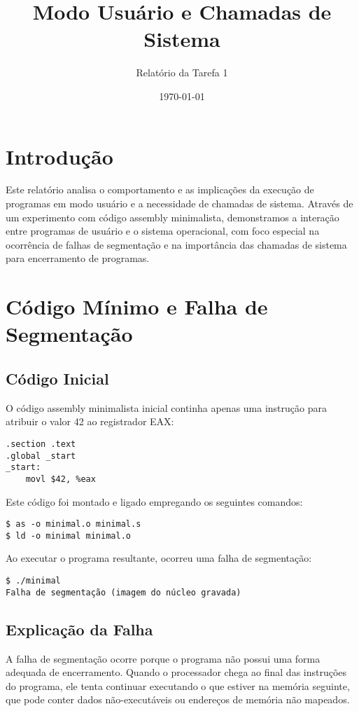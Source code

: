 \documentclass[12pt,a4paper]{article}
\title{Modo Usuário e Chamadas de Sistema}
\author{Relatório da Tarefa 1}
\date{\today}
\begin{document}
\maketitle

\section{Introdução}

Este relatório analisa o comportamento e as implicações da execução de programas em modo usuário e a necessidade de chamadas de sistema. Através de um experimento com código assembly minimalista, demonstramos a interação entre programas de usuário e o sistema operacional, com foco especial na ocorrência de falhas de segmentação e na importância das chamadas de sistema para encerramento de programas.

\section{Código Mínimo e Falha de Segmentação}

\subsection{Código Inicial}

O código assembly minimalista inicial continha apenas uma instrução para atribuir o valor 42 ao registrador EAX:

\begin{verbatim}
.section .text
.global _start
_start:
    movl $42, %eax
\end{verbatim}

Este código foi montado e ligado empregando os seguintes comandos:

\begin{verbatim}
$ as -o minimal.o minimal.s
$ ld -o minimal minimal.o
\end{verbatim}

Ao executar o programa resultante, ocorreu uma falha de segmentação:

\begin{verbatim}
$ ./minimal
Falha de segmentação (imagem do núcleo gravada)
\end{verbatim}

\subsection{Explicação da Falha}

A falha de segmentação ocorre porque o programa não possui uma forma adequada de encerramento. Quando o processador chega ao final das instruções do programa, ele tenta continuar executando o que estiver na memória seguinte, que pode conter dados não-executáveis ou endereços de memória não mapeados.
\end{document}
